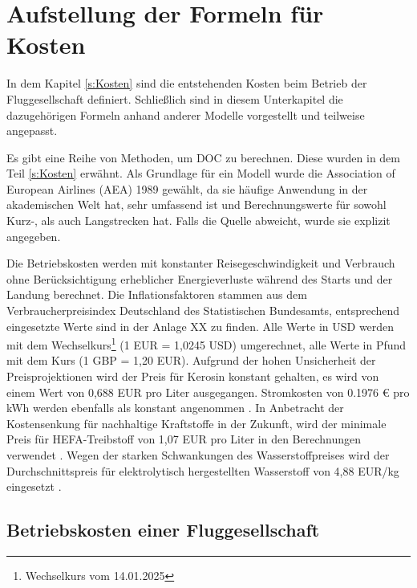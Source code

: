 \section{Aufstellung der Formeln für Kosten}
\label{s:Aufstellung der Formeln für Kosten}

In dem Kapitel \ref{s:Kosten} sind die entstehenden Kosten beim Betrieb der Fluggesellschaft definiert.
Schließlich sind in diesem Unterkapitel die dazugehörigen Formeln anhand anderer Modelle vorgestellt und teilweise angepasst. 

Es gibt eine Reihe von Methoden, um DOC zu berechnen. 
Diese wurden in dem Teil \ref{s:Kosten} erwähnt.
Als Grundlage für ein Modell wurde die Association of European Airlines (AEA) 1989 gewählt, 
da sie häufige Anwendung in der akademischen Welt hat, 
sehr umfassend ist und Berechnungswerte für sowohl Kurz-, als auch Langstrecken hat. 
Falls die Quelle abweicht, wurde sie explizit angegeben. %

Die Betriebskosten werden mit konstanter Reisegeschwindigkeit und Verbrauch ohne 
Berücksichtigung erheblicher Energieverluste während des Starts und der Landung berechnet. 
Die Inflationsfaktoren stammen aus dem Verbraucherpreisindex Deutschland des Statistischen Bundesamts, 
entsprechend eingesetzte Werte sind in der Anlage XX zu finden. %
Alle Werte in USD werden mit dem Wechselkurs\footnote{Wechselkurs vom 14.01.2025} (1 EUR = 1,0245 USD)
umgerechnet, alle Werte in Pfund mit dem Kurs (1 GBP = 1,20 EUR).
Aufgrund der hohen Unsicherheit der Preisprojektionen wird der Preis für Kerosin 
konstant gehalten, es wird von einem Wert von 0,688 EUR pro Liter \cite{iata_industry_statistics_2024} ausgegangen. 
Stromkosten von 0.1976 € pro kWh werden ebenfalls als konstant angenommen \cite{eurostat_nrg_pc_205}.
In Anbetracht der Kostensenkung für nachhaltige Kraftstoffe in der Zukunft, 
wird der minimale Preis für HEFA-Treibstoff von 1,07 EUR pro Liter in den Berechnungen verwendet \cite{watson2024sustainable}.
Wegen der starken Schwankungen des Wasserstoffpreises wird der Durchschnittspreis für 
elektrolytisch hergestellten Wasserstoff von 4,88 EUR/kg eingesetzt \cite{hoelzen2022hydrogen}.
%
%
\subsection{Betriebskosten einer Fluggesellschaft}

